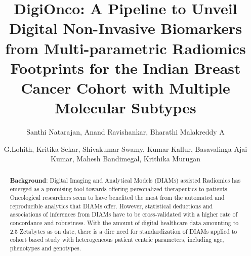\documentclass[final,1p,times,twocolumn]{elsarticle}
\begin{document}
\begin{frontmatter}



\title{DigiOnco: A Pipeline to Unveil Digital Non-Invasive Biomarkers from Multi-parametric Radiomics Footprints for the Indian Breast Cancer Cohort with Multiple Molecular Subtypes}


\author[label1]{Santhi Natarajan, Anand Ravishankar, Bharathi Malakreddy A }
\author[label2]{G.Lohith, Kritika Sekar, Shivakumar Swamy, Kumar Kallur, Basavalinga Ajai Kumar, Mahesh Bandimegal, Krithika Murugan}
\address[label1]{RadioGenomics Research Group, BMS Institute of Technology and Management, Visweswaraiah Technological Univesity, Bangalore, India}
\address[label2]{Health Care Global (HCG) Hospitals, Bangalore, India}

\begin{abstract}
\textbf{Background}: Digital Imaging and Analytical Models (DIAMs) assisted Radiomics has emerged as a promising tool towards offering personalized therapeutics to patients. Oncological researchers seem to have benefited the most from the automated and reproducible analytics that DIAMs offer. However, statistical deductions and associations of inferences from DIAMs have to be cross-validated with a higher rate of concordance and robustness. With the amount of digital healthcare data amounting to 2.5 Zetabytes as on date, there is a dire need for standardization of DIAMs applied to cohort based study with heterogeneous patient centric parameters, including age, phenotypes and genotypes. 


\end{abstract}
\end{frontmatter}
\end{document}
